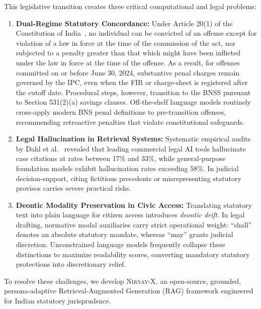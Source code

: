 \documentclass[conference]{IEEEtran}
\begin{document}
This legislative transition creates three critical computational and legal problems:
\begin{enumerate}
    \item \textbf{Dual-Regime Statutory Concordance:} Under Article 20(1) of the Constitution of India~\cite{constitution1950}, no individual can be convicted of an offense except for violation of a law in force at the time of the commission of the act, nor subjected to a penalty greater than that which might have been inflicted under the law in force at the time of the offense. As a result, for offenses committed on or before June 30, 2024, substantive penal charges remain governed by the IPC, even when the FIR or charge-sheet is registered after the cutoff date. Procedural steps, however, transition to the BNSS pursuant to Section 531(2)(a) savings clauses. Off-the-shelf language models routinely cross-apply modern BNS penal definitions to pre-transition offenses, recommending retroactive penalties that violate constitutional safeguards.
    \item \textbf{Legal Hallucination in Retrieval Systems:} Systematic empirical audits by Dahl et al.~\cite{dahl2024large} revealed that leading commercial legal AI tools hallucinate case citations at rates between 17\% and 33\%, while general-purpose foundation models exhibit hallucination rates exceeding 58\%. In judicial decision-support, citing fictitious precedents or misrepresenting statutory provisos carries severe practical risks.
    \item \textbf{Deontic Modality Preservation in Civic Access:} Translating statutory text into plain language for citizen access introduces \textit{deontic drift}. In legal drafting, normative modal auxiliaries carry strict operational weight: ``shall'' denotes an absolute statutory mandate, whereas ``may'' grants judicial discretion. Unconstrained language models frequently collapse these distinctions to maximize readability scores, converting mandatory statutory protections into discretionary relief.
\end{enumerate}

To resolve these challenges, we develop \textsc{Nirnay-X}, an open-source, grounded, persona-adaptive Retrieval-Augmented Generation (RAG) framework engineered for Indian statutory jurisprudence. 
\end{document}
